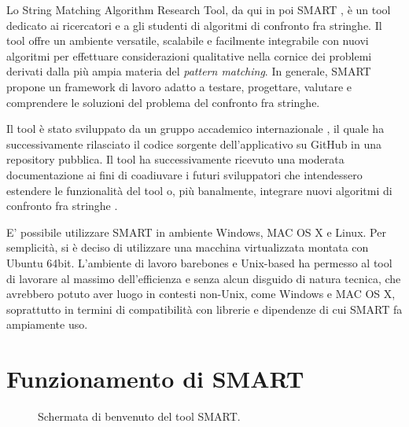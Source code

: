 Lo String Matching Algorithm Research Tool, da qui in poi SMART \cite{smart}, è un tool dedicato ai ricercatori e a gli studenti di algoritmi di confronto fra stringhe. Il tool offre un ambiente versatile, scalabile e facilmente integrabile con nuovi algoritmi per effettuare considerazioni qualitative nella cornice dei problemi derivati dalla più ampia materia del \textit{pattern matching}. In generale, SMART propone un framework di lavoro adatto a testare, progettare, valutare e comprendere le soluzioni del problema del confronto fra stringhe. 

\vspace{3mm}

Il tool è stato sviluppato da un gruppo accademico internazionale \cite{smartHomepage}, il quale ha successivamente rilasciato il codice sorgente dell'applicativo su GitHub in una repository pubblica. Il tool ha successivamente ricevuto una moderata documentazione ai fini di coadiuvare i futuri sviluppatori che intendessero estendere le funzionalità del tool o, più banalmente, integrare nuovi algoritmi di confronto fra stringhe \cite{smartHelp}.

\vspace{3mm}

E' possibile utilizzare SMART in ambiente Windows, MAC OS X e Linux. Per semplicità, si è deciso di utilizzare una macchina virtualizzata montata con Ubuntu 64bit. L'ambiente di lavoro barebones e Unix-based ha permesso al tool di lavorare al massimo dell'efficienza e senza alcun disguido di natura tecnica, che avrebbero potuto aver luogo in contesti non-Unix, come Windows e MAC OS X, soprattutto in termini di compatibilità con librerie e dipendenze di cui SMART fa ampiamente uso.

\section{Funzionamento di SMART}

\begin{figure}[ht!]
    \centering
    \caption{Schermata di benvenuto del tool SMART.}
    \label{fig:esempio}
\end{figure}

